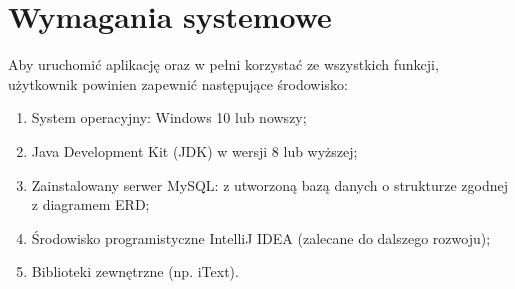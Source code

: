 \section{Wymagania systemowe}
\label{sec:wymaganiaSystemowe}
Aby uruchomić aplikację oraz w pełni korzystać ze wszystkich funkcji, użytkownik powinien zapewnić następujące środowisko:
\begin{enumerate}%
\item System operacyjny: Windows 10 lub nowszy;
\item Java Development Kit (JDK) w wersji 8 lub wyższej;
\item Zainstalowany serwer MySQL: z utworzoną bazą danych o strukturze zgodnej z diagramem ERD;
\item Środowisko programistyczne IntelliJ IDEA (zalecane do dalszego rozwoju);
\item Biblioteki zewnętrzne (np. iText).

\end{enumerate}

